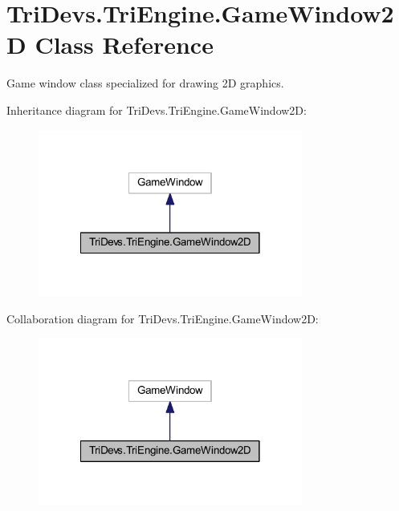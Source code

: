 \hypertarget{class_tri_devs_1_1_tri_engine_1_1_game_window2_d}{\section{Tri\-Devs.\-Tri\-Engine.\-Game\-Window2\-D Class Reference}
\label{class_tri_devs_1_1_tri_engine_1_1_game_window2_d}
}


Game window class specialized for drawing 2\-D graphics.  




Inheritance diagram for Tri\-Devs.\-Tri\-Engine.\-Game\-Window2\-D\-:
\nopagebreak
\begin{figure}[H]
\begin{center}
\leavevmode
\includegraphics[width=246pt]{class_tri_devs_1_1_tri_engine_1_1_game_window2_d__inherit__graph}
\end{center}
\end{figure}


Collaboration diagram for Tri\-Devs.\-Tri\-Engine.\-Game\-Window2\-D\-:
\nopagebreak
\begin{figure}[H]
\begin{center}
\leavevmode
\includegraphics[width=246pt]{class_tri_devs_1_1_tri_engine_1_1_game_window2_d__coll__graph}
\end{center}
\end{figure}
